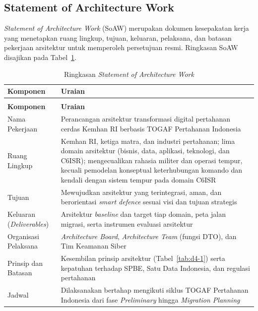 \subsection{Statement of Architecture Work}

\textit{Statement of Architecture Work} (SoAW) merupakan dokumen kesepakatan kerja yang menetapkan ruang lingkup, tujuan, keluaran, pelaksana, dan batasan pekerjaan arsitektur untuk memperoleh persetujuan resmi. Ringkasan SoAW disajikan pada Tabel~\ref{tab:d4-9}.

\begin{longtable}{@{}>{\raggedright\arraybackslash}p{}>{\raggedright\arraybackslash}p{}@{}}
\caption{Ringkasan \textit{Statement of Architecture Work}}
\label{tab:d4-9}\\
\toprule
\textbf{Komponen} & \textbf{Uraian}\\
\midrule
\endfirsthead
\multicolumn{2}{@{}l}{\small\itshape \tablename\ \thetable{} (lanjutan)}\\
\toprule
\textbf{Komponen} & \textbf{Uraian}\\
\midrule
\endhead
\bottomrule
\endlastfoot
Nama Pekerjaan & Perancangan arsitektur transformasi digital pertahanan cerdas Kemhan RI berbasis TOGAF Pertahanan Indonesia\\
Ruang Lingkup & Kemhan RI, ketiga matra, dan industri pertahanan; lima domain arsitektur (bisnis, data, aplikasi, teknologi, dan C6ISR); mengecualikan rahasia militer dan operasi tempur, kecuali pemodelan konseptual keterhubungan komando dan kendali dengan sistem tempur pada domain C6ISR\\
Tujuan & Mewujudkan arsitektur yang terintegrasi, aman, dan berorientasi \textit{smart defence} sesuai visi dan tujuan strategis\\
Keluaran (\textit{Deliverables}) & Arsitektur \textit{baseline} dan target tiap domain, peta jalan migrasi, serta instrumen evaluasi arsitektur\\
Organisasi Pelaksana & \textit{Architecture Board}, \textit{Architecture Team} (fungsi DTO), dan Tim Keamanan Siber\\
Prinsip dan Batasan & Kesembilan prinsip arsitektur (Tabel~\ref{tab:d4-1}) serta kepatuhan terhadap SPBE, Satu Data Indonesia, dan regulasi pertahanan\\
Jadwal & Dilaksanakan bertahap mengikuti siklus TOGAF Pertahanan Indonesia dari fase \textit{Preliminary} hingga \textit{Migration Planning}\\
\end{longtable}

